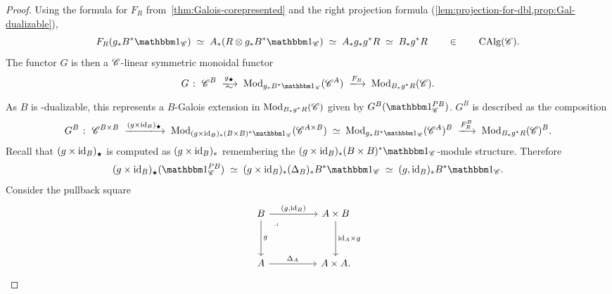 \documentclass[english,svgnames,table]{article}
\begin{document}
\begin{proof}
        Using the formula for $F_R$ from~\cref{thm:Galois-corepresented} and the right projection formula (\cref{lem:projection-for-dbl,prop:Gal-dualizable}),
        \begin{equation*}
            F_R(g_* B^* \ounit_{\cC}) \;\simeq\; A_*(R \otimes g_* B^* \ounit_{\cC}) \;\simeq\; A_*g_*g^*R \;\simeq\; B_*g^*R \qin \CAlg(\cC).
        \end{equation*}
        The functor $G$ is then a $\mathscr{C}$-linear symmetric monoidal functor
        \begin{equation*}
            G \;\colon\; \cC^B \;\xisotoo{g_{\scriptscriptstyle\bigstar}}\; \Mod_{g_* B^* \ounit_{\cC}}(\cC^A) \;\xtoo{F_R}\; \Mod_{B_* g^* R}(\cC).
        \end{equation*}
        As $B$ is \CO-dualizable, this represents a $B$-Galois extension in $\operatorname{Mod}_{B_* g^* R}(\mathscr{C})$ given by $G^B(\ounit_{\cC}^{\Path B})$.
        $G^B$ is described as the composition
        \begin{equation*}
            G^B \;\colon\; \cC^{B \times B} \;\xtoo{(g \times \id_B)_{\scriptscriptstyle\bigstar}}\; \Mod_{(g \times \id_B)_* (B \times B)^* \ounit_{\cC}}(\cC^{A \times B}) \;\simeq\; \Mod_{g_* B^* \ounit_{\cC}}(\cC^A)^B \;\xtoo{F_R^B}\; \Mod_{B_* g^* R}(\cC)^B. 
        \end{equation*}
        Recall that $(g \times \mathrm{id}_B)_{\scriptscriptstyle\bigstar}$ is computed as $(g \times \mathrm{id}_B)_*$ remembering the $(g \times \id_B)_* (B \times B)^* \ounit_{\cC}$-module structure. Therefore
        \begin{equation*}
            (g \times \id_B)_{\scriptscriptstyle\bigstar}(\ounit_{\cC}^{\Path B}) \;\simeq\; (g \times \id_B)_* (\Delta_B)_* B^* \ounit_{\cC} \;\simeq\; (g, \id_B)_* B^* \ounit_{\cC}.
        \end{equation*}
        Consider the pullback square
        \begin{equation*}
            \begin{tikzcd}
                B && {A \times B} \\
                \\
                A && {A\times A.}
                \arrow["{(g,\id_B)}", from=1-1, to=1-3]
                \arrow["g", from=1-1, to=3-1]
                \arrow["\lrcorner"{anchor=center, pos=0.125}, draw=none, from=1-1, to=3-3]
                \arrow["\id_A \times g", from=1-3, to=3-3]
                \arrow["{\Delta_A}", from=3-1, to=3-3]
            \end{tikzcd}
        \end{equation*}

\end{proof}
\end{document}
